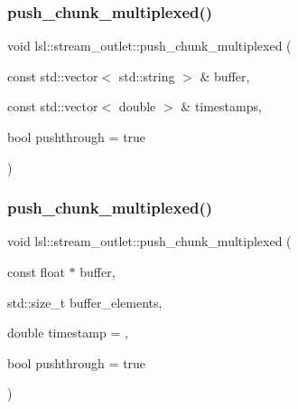 \subsubsection{\texorpdfstring{push\+\_\+chunk\+\_\+multiplexed()}{push\_chunk\_multiplexed()}\hspace{0.1cm}{\footnotesize\ttfamily [14/28]}}
{\footnotesize\ttfamily void lsl\+::stream\+\_\+outlet\+::push\+\_\+chunk\+\_\+multiplexed (\begin{DoxyParamCaption}\item[{const std\+::vector$<$ std\+::string $>$ \&}]{buffer,  }\item[{const std\+::vector$<$ double $>$ \&}]{timestamps,  }\item[{bool}]{pushthrough = {\ttfamily true} }\end{DoxyParamCaption})\hspace{0.3cm}{\ttfamily [inline]}}

\mbox{\label{classlsl_1_1stream__outlet_a7ea80b891c9aaf7b4c62c715692218cc}} 
\subsubsection{\texorpdfstring{push\+\_\+chunk\+\_\+multiplexed()}{push\_chunk\_multiplexed()}\hspace{0.1cm}{\footnotesize\ttfamily [15/28]}}
{\footnotesize\ttfamily void lsl\+::stream\+\_\+outlet\+::push\+\_\+chunk\+\_\+multiplexed (\begin{DoxyParamCaption}\item[{const float $\ast$}]{buffer,  }\item[{std\+::size\+\_\+t}]{buffer\+\_\+elements,  }\item[{double}]{timestamp = {},  }\item[{bool}]{pushthrough = {\ttfamily true} }\end{DoxyParamCaption})\hspace{0.3cm}{\ttfamily [inline]}}

